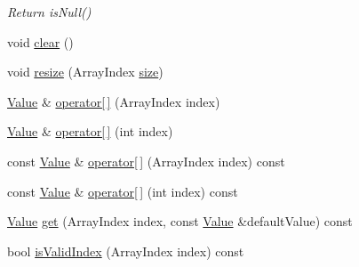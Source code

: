 \begin{DoxyCompactItemize}
\begin{DoxyCompactList}\small\item\em Return is\+Null() \end{DoxyCompactList}\item 
void \hyperlink{class_json_1_1_value_a501a4d67e6c875255c2ecc03ccd2019b}{clear} ()
\item 
void \hyperlink{class_json_1_1_value_aa284353271ada427dbfa04a42f2be407}{resize} (Array\+Index \hyperlink{class_json_1_1_value_a4ca8ee6c48a34ca6c2f131956bab5e05}{size})
\item 
\hyperlink{class_json_1_1_value}{Value} \& \hyperlink{class_json_1_1_value_a7d99f5dba388cdaa152ce6ef933d64ef}{operator\mbox{[}$\,$\mbox{]}} (Array\+Index index)
\item 
\hyperlink{class_json_1_1_value}{Value} \& \hyperlink{class_json_1_1_value_ac9182982c361e0ab621134d406e5f250}{operator\mbox{[}$\,$\mbox{]}} (int index)
\item 
const \hyperlink{class_json_1_1_value}{Value} \& \hyperlink{class_json_1_1_value_af151919e8947c430e34bed2b0b128601}{operator\mbox{[}$\,$\mbox{]}} (Array\+Index index) const 
\item 
const \hyperlink{class_json_1_1_value}{Value} \& \hyperlink{class_json_1_1_value_af9e02b38f4e63e491c300c20b275bdd7}{operator\mbox{[}$\,$\mbox{]}} (int index) const 
\item 
\hyperlink{class_json_1_1_value}{Value} \hyperlink{class_json_1_1_value_a28282c9b76fa031eba7a1843c47c16fe}{get} (Array\+Index index, const \hyperlink{class_json_1_1_value}{Value} \&default\+Value) const 
\item 
bool \hyperlink{class_json_1_1_value_aaa82ebb4b730ea1567d310874f47d147}{is\+Valid\+Index} (Array\+Index index) const \hypertarget{class_json_1_1_value_aaa82ebb4b730ea1567d310874f47d147}{}\label{class_json_1_1_value_aaa82ebb4b730ea1567d310874f47d147}


\end{DoxyCompactItemize}
